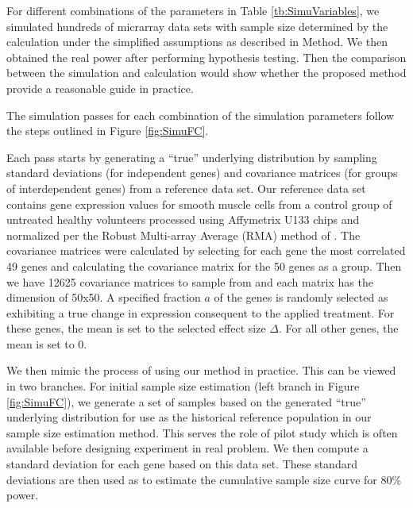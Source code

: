 \documentclass[12pt]{article}
\begin{document}
For different combinations of the parameters in Table
\ref{tb:SimuVariables}, we simulated hundreds of micrarray data
sets with sample size determined by the calculation under the
simplified assumptions as described in Method.  We then obtained
the real power after performing hypothesis testing.  Then the
comparison between the simulation and calculation would show
whether the proposed method provide a reasonable guide in
practice.

The simulation passes for each combination of the simulation
parameters follow the steps outlined in Figure \ref{fig:SimuFC}.

Each pass starts by generating a ``true'' underlying distribution
by sampling standard deviations (for independent genes) and
covariance matrices (for groups of interdependent genes) from a
reference data set.  Our reference data set contains gene
expression values for smooth muscle cells from a control group of
untreated healthy volunteers processed using Affymetrix U133 chips
and normalized per the Robust Multi-array Average (RMA) method of
\citet{Irizarry03}.  The covariance matrices were calculated by
selecting for each gene the most correlated 49 genes and
calculating the covariance matrix for the 50 genes as a group.
Then we have 12625 covariance matrices to sample from and each
matrix has the dimension of 50x50. A specified fraction $a$ of the
genes is randomly selected as exhibiting a true change in
expression consequent to the applied treatment. For these genes,
the mean is set to the selected effect size $\Delta$. For all
other genes, the mean is set to $0$.

We then mimic the process of using our method in practice. This
can be viewed in two branches. For initial sample size estimation
(left branch in Figure \ref{fig:SimuFC}), we generate a set of
samples based on the generated ``true'' underlying distribution
for use as the historical reference population in our sample size
estimation method.  This serves the role of pilot study which is
often available before designing experiment in real problem.  We
then compute a standard deviation for each gene based on this data
set.  These standard deviations are then used as to estimate the
cumulative sample size curve for 80\% power.
\end{document}
